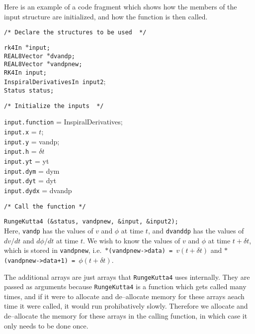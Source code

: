\documentclass[12pt]{article}
\begin{document}
Here is an example of a code fragment which shows how the members of the input structure are initialized, and how the function is then called.

\vspace{5mm}

\noindent
\begin{verbatim}
/* Declare the structures to be used  */
\end{verbatim}
\texttt{rk4In $\ast$input;} \\
\texttt{REAL8Vector $\ast$dvandp;} \\
\texttt{REAL8Vector $\ast$vandpnew;} \\
\texttt{RK4In input;} \\
\texttt{InspiralDerivativesIn input2}; \\
\texttt{Status status;} \\
\begin{verbatim}
/* Initialize the inputs  */
\end{verbatim}
\texttt{input.function} = InspiralDerivatives; \\
\texttt{input.x} = $t$; \\
\texttt{input.y} = vandp; \\
\texttt{input.h} = $\delta t$ \\
\texttt{input.yt} = yt \\
\texttt{input.dym} = dym \\
\texttt{input.dyt} = dyt \\
\texttt{input.dydx} = dvandp \\
\begin{verbatim}
/* Call the function */
\end{verbatim}
\texttt{RungeKutta4 (\&status, vandpnew, \&input, \&input2);} \\


Here, \texttt{vandp} has the values of $v$ and $\phi$ at time $t$, and \texttt{dvanddp} has the values of $dv/dt$ and $d\phi/dt$ at time $t$. We wish to know the values of $v$ and $\phi$ at time $t + \delta t$, which is stored in \texttt{vandpnew}, i.e.\ \texttt{$\ast$(vandpnew->data) = $v(t + \delta t)$} and \texttt{$\ast$(vandpnew->data+1) = $\phi(t + \delta t)$}.

The additional arrays are just arrays that \texttt{RungeKutta4} uses internally. They are passed as arguments because \texttt{RungeKutta4} is a function which gets called many times, and if it were to allocate and de--allocate memory for these arrays aeach time it were called, it would run prohibatively slowly. Therefore we allocate and de--allocate the memory for these arrays in the calling function, in which case it only needs to be done once.
\end{document}

